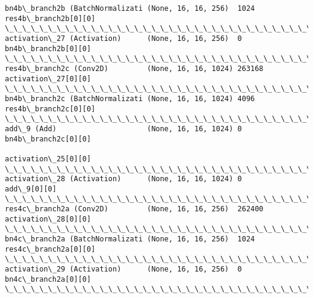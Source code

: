\documentclass[11pt]{article}
\begin{document}
\begin{Verbatim}[commandchars=\\\{\}]
bn4b\_branch2b (BatchNormalizati (None, 16, 16, 256)  1024        res4b\_branch2b[0][0]             
\_\_\_\_\_\_\_\_\_\_\_\_\_\_\_\_\_\_\_\_\_\_\_\_\_\_\_\_\_\_\_\_\_\_\_\_\_\_\_\_\_\_\_\_\_\_\_\_\_\_\_\_\_\_\_\_\_\_\_\_\_\_\_\_\_\_\_\_\_\_\_\_\_\_\_\_\_\_\_\_\_\_\_\_\_\_\_\_\_\_\_\_\_\_\_\_\_\_
activation\_27 (Activation)      (None, 16, 16, 256)  0           bn4b\_branch2b[0][0]              
\_\_\_\_\_\_\_\_\_\_\_\_\_\_\_\_\_\_\_\_\_\_\_\_\_\_\_\_\_\_\_\_\_\_\_\_\_\_\_\_\_\_\_\_\_\_\_\_\_\_\_\_\_\_\_\_\_\_\_\_\_\_\_\_\_\_\_\_\_\_\_\_\_\_\_\_\_\_\_\_\_\_\_\_\_\_\_\_\_\_\_\_\_\_\_\_\_\_
res4b\_branch2c (Conv2D)         (None, 16, 16, 1024) 263168      activation\_27[0][0]              
\_\_\_\_\_\_\_\_\_\_\_\_\_\_\_\_\_\_\_\_\_\_\_\_\_\_\_\_\_\_\_\_\_\_\_\_\_\_\_\_\_\_\_\_\_\_\_\_\_\_\_\_\_\_\_\_\_\_\_\_\_\_\_\_\_\_\_\_\_\_\_\_\_\_\_\_\_\_\_\_\_\_\_\_\_\_\_\_\_\_\_\_\_\_\_\_\_\_
bn4b\_branch2c (BatchNormalizati (None, 16, 16, 1024) 4096        res4b\_branch2c[0][0]             
\_\_\_\_\_\_\_\_\_\_\_\_\_\_\_\_\_\_\_\_\_\_\_\_\_\_\_\_\_\_\_\_\_\_\_\_\_\_\_\_\_\_\_\_\_\_\_\_\_\_\_\_\_\_\_\_\_\_\_\_\_\_\_\_\_\_\_\_\_\_\_\_\_\_\_\_\_\_\_\_\_\_\_\_\_\_\_\_\_\_\_\_\_\_\_\_\_\_
add\_9 (Add)                     (None, 16, 16, 1024) 0           bn4b\_branch2c[0][0]              
                                                                 activation\_25[0][0]              
\_\_\_\_\_\_\_\_\_\_\_\_\_\_\_\_\_\_\_\_\_\_\_\_\_\_\_\_\_\_\_\_\_\_\_\_\_\_\_\_\_\_\_\_\_\_\_\_\_\_\_\_\_\_\_\_\_\_\_\_\_\_\_\_\_\_\_\_\_\_\_\_\_\_\_\_\_\_\_\_\_\_\_\_\_\_\_\_\_\_\_\_\_\_\_\_\_\_
activation\_28 (Activation)      (None, 16, 16, 1024) 0           add\_9[0][0]                      
\_\_\_\_\_\_\_\_\_\_\_\_\_\_\_\_\_\_\_\_\_\_\_\_\_\_\_\_\_\_\_\_\_\_\_\_\_\_\_\_\_\_\_\_\_\_\_\_\_\_\_\_\_\_\_\_\_\_\_\_\_\_\_\_\_\_\_\_\_\_\_\_\_\_\_\_\_\_\_\_\_\_\_\_\_\_\_\_\_\_\_\_\_\_\_\_\_\_
res4c\_branch2a (Conv2D)         (None, 16, 16, 256)  262400      activation\_28[0][0]              
\_\_\_\_\_\_\_\_\_\_\_\_\_\_\_\_\_\_\_\_\_\_\_\_\_\_\_\_\_\_\_\_\_\_\_\_\_\_\_\_\_\_\_\_\_\_\_\_\_\_\_\_\_\_\_\_\_\_\_\_\_\_\_\_\_\_\_\_\_\_\_\_\_\_\_\_\_\_\_\_\_\_\_\_\_\_\_\_\_\_\_\_\_\_\_\_\_\_
bn4c\_branch2a (BatchNormalizati (None, 16, 16, 256)  1024        res4c\_branch2a[0][0]             
\_\_\_\_\_\_\_\_\_\_\_\_\_\_\_\_\_\_\_\_\_\_\_\_\_\_\_\_\_\_\_\_\_\_\_\_\_\_\_\_\_\_\_\_\_\_\_\_\_\_\_\_\_\_\_\_\_\_\_\_\_\_\_\_\_\_\_\_\_\_\_\_\_\_\_\_\_\_\_\_\_\_\_\_\_\_\_\_\_\_\_\_\_\_\_\_\_\_
activation\_29 (Activation)      (None, 16, 16, 256)  0           bn4c\_branch2a[0][0]              
\_\_\_\_\_\_\_\_\_\_\_\_\_\_\_\_\_\_\_\_\_\_\_\_\_\_\_\_\_\_\_\_\_\_\_\_\_\_\_\_\_\_\_\_\_\_\_\_\_\_\_\_\_\_\_\_\_\_\_\_\_\_\_\_\_\_\_\_\_\_\_\_\_\_\_\_\_\_\_\_\_\_\_\_\_\_\_\_\_\_\_\_\_\_\_\_\_\_

\end{Verbatim}
\end{document}

